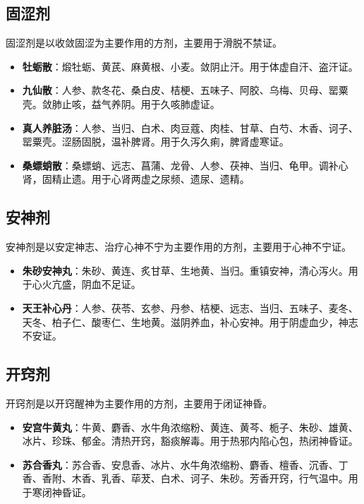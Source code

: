 \documentclass[12pt,UTF8]{ctexbook}
\begin{document}
\subsection{固涩剂}

固涩剂是以收敛固涩为主要作用的方剂，主要用于滑脱不禁证。

\begin{itemize}
\item \textbf{牡蛎散}：煅牡蛎、黄芪、麻黄根、小麦。敛阴止汗。用于体虚自汗、盗汗证。
\item \textbf{九仙散}：人参、款冬花、桑白皮、桔梗、五味子、阿胶、乌梅、贝母、罂粟壳。敛肺止咳，益气养阴。用于久咳肺虚证。
\item \textbf{真人养脏汤}：人参、当归、白术、肉豆蔻、肉桂、甘草、白芍、木香、诃子、罂粟壳。涩肠固脱，温补脾肾。用于久泻久痢，脾肾虚寒证。
\item \textbf{桑螵蛸散}：桑螵蛸、远志、菖蒲、龙骨、人参、茯神、当归、龟甲。调补心肾，固精止遗。用于心肾两虚之尿频、遗尿、遗精。
\end{itemize}

\subsection{安神剂}

安神剂是以安定神志、治疗心神不宁为主要作用的方剂，主要用于心神不宁证。

\begin{itemize}
\item \textbf{朱砂安神丸}：朱砂、黄连、炙甘草、生地黄、当归。重镇安神，清心泻火。用于心火亢盛，阴血不足证。
\item \textbf{天王补心丹}：人参、茯苓、玄参、丹参、桔梗、远志、当归、五味子、麦冬、天冬、柏子仁、酸枣仁、生地黄。滋阴养血，补心安神。用于阴虚血少，神志不安证。
\end{itemize}

\subsection{开窍剂}

开窍剂是以开窍醒神为主要作用的方剂，主要用于闭证神昏。

\begin{itemize}
\item \textbf{安宫牛黄丸}：牛黄、麝香、水牛角浓缩粉、黄连、黄芩、栀子、朱砂、雄黄、冰片、珍珠、郁金。清热开窍，豁痰解毒。用于热邪内陷心包，热闭神昏证。
\item \textbf{苏合香丸}：苏合香、安息香、冰片、水牛角浓缩粉、麝香、檀香、沉香、丁香、香附、木香、乳香、荜茇、白术、诃子、朱砂。芳香开窍，行气温中。用于寒闭神昏证。
\end{itemize}
\end{document}
